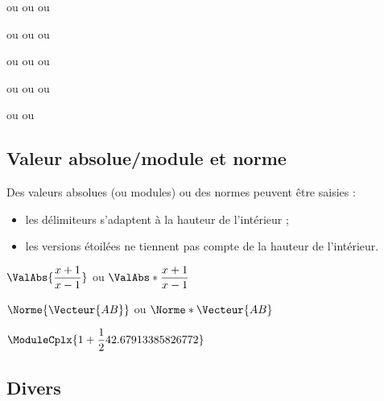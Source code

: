\begin{PresCodeTexPL}{}

\end{PresCodeTexPL}

\begin{PresCodeTexPL}{}
\RepereOij ou \RepereOij* ou \RepereOij[Sep={,}] ou \RepereOij*[Sep={,}]

\RepereOijk ou \RepereOijk* ou \RepereOijk[Sep={,}] ou \RepereOijk*[Sep={,}]

\RepereOuv ou \RepereOuv* ou \RepereOuv[Sep={,}] ou \RepereOuv*[Sep={,}]
\end{PresCodeTexPL}

\begin{PresCodeTexPL}{}
 ou  ou  ou 

 ou  ou 
\end{PresCodeTexPL}

\subsection{Valeur absolue/module et norme}

\begin{tipblock}
Des valeurs absolues (ou modules) ou des normes peuvent être saisies :

\begin{itemize}
	\item les délimiteurs s'adaptent à la hauteur de l'intérieur ;
	\item les versions étoilées ne tiennent pas compte de la hauteur de l'intérieur.
\end{itemize}
\vspace*{-\baselineskip}\leavevmode
\end{tipblock}

\begin{PresCodeTexPL}{}
$\ValAbs{\dfrac{x+1}{x-1}}$ ou $\ValAbs*{\dfrac{x+1}{x-1}}$

$\Norme{\Vecteur{AB}}$ ou $\Norme*{\Vecteur{AB}}$

$\ModuleCplx{1+\dfrac12\i}$
\end{PresCodeTexPL}

\subsection{Divers}

